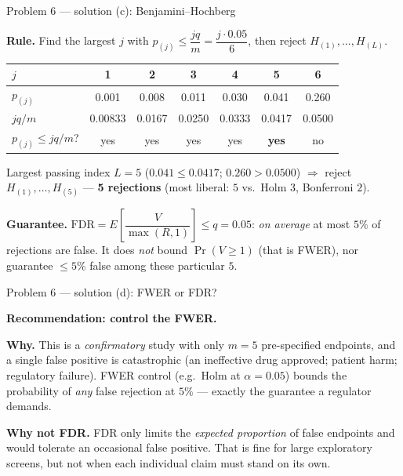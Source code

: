\documentclass[aspectratio=169,11pt]{beamer}
\begin{document}
\begin{frame}{Problem 6 --- solution (c): Benjamini--Hochberg}
  \begin{solutionbox}[Solution P6(c) --- BH at FDR level {$q=0.05$}]
    \textbf{Rule.} Find the largest $j$ with $p_{(j)}\le\dfrac{jq}{m}=\dfrac{j\cdot0.05}{6}$, then
    reject $H_{(1)},\dots,H_{(L)}$.
    \begin{center}\footnotesize
    \begin{tabular}{lcccccc}
      \toprule
      $j$ & 1 & 2 & 3 & 4 & 5 & 6\\
      \midrule
      $p_{(j)}$ & 0.001 & 0.008 & 0.011 & 0.030 & 0.041 & 0.260\\
      $jq/m$ & 0.00833 & 0.0167 & 0.0250 & 0.0333 & 0.0417 & 0.0500\\
      $p_{(j)}\le jq/m$? & yes & yes & yes & yes & \textbf{yes} & no\\
      \bottomrule
    \end{tabular}
    \end{center}
    Largest passing index $L=5$ ($0.041\le0.0417$; $0.260>0.0500$) $\Rightarrow$ reject
    $H_{(1)},\dots,H_{(5)}$ --- \textbf{5 rejections} (most liberal: $5$ vs.\ Holm $3$, Bonferroni $2$).
    \smallskip

    \textbf{Guarantee.} $\text{FDR}=E\!\left[\dfrac{V}{\max(R,1)}\right]\le q=0.05$: \emph{on
    average} at most $5\%$ of rejections are false. It does \emph{not} bound $\Pr(V\ge1)$ (that is
    FWER), nor guarantee $\le5\%$ false among these particular $5$.
  \end{solutionbox}
\end{frame}

\begin{frame}{Problem 6 --- solution (d): FWER or FDR?}
  \begin{solutionbox}
    \textbf{Recommendation: control the FWER.}
    \medskip

    \textbf{Why.} This is a \emph{confirmatory} study with only $m=5$ pre-specified endpoints, and
    a single false positive is catastrophic (an ineffective drug approved; patient harm;
    regulatory failure). FWER control (e.g.\ Holm at $\alpha=0.05$) bounds the probability of
    \emph{any} false rejection at $5\%$ --- exactly the guarantee a regulator demands.
    \medskip

    \textbf{Why not FDR.} FDR only limits the \emph{expected proportion} of false endpoints and
    would tolerate an occasional false positive. That is fine for large exploratory screens, but
    not when each individual claim must stand on its own.
  \end{solutionbox}
\end{frame}
\end{document}
